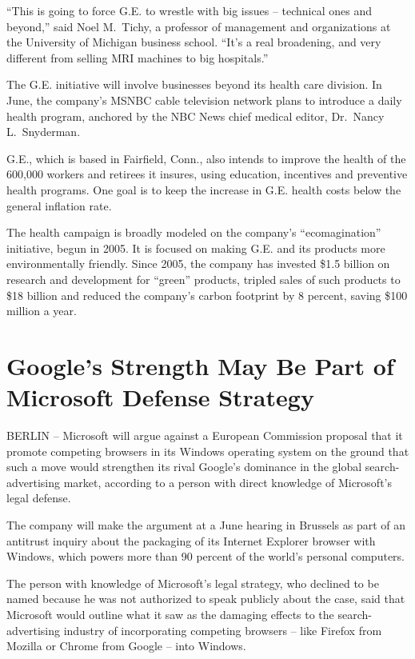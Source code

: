 \documentclass[12pt,a4paper,onecolumn]{article}
\begin{document}
``This is going to force G.E. to wrestle with big issues -- technical ones and beyond,'' said Noel
M.~Tichy, a professor of management and organizations at the University of Michigan business school.
``It's a real broadening, and very different from selling MRI machines to big hospitals.''

The G.E. initiative will involve businesses beyond its health care division. In June, the company's
MSNBC cable television network plans to introduce a daily health program, anchored by the NBC News
chief medical editor, Dr.~Nancy L.~Snyderman.

G.E., which is based in Fairfield, Conn., also intends to improve the health of the 600,000 workers
and retirees it insures, using education, incentives and preventive health programs. One goal is to
keep the increase in G.E. health costs below the general inflation rate.

The health campaign is broadly modeled on the company's ``ecomagination'' initiative, begun in 2005.
It is focused on making G.E. and its products more environmentally friendly. Since 2005, the company
has invested \$1.5 billion on research and development for ``green'' products, tripled sales of such
products to \$18 billion and reduced the company's carbon footprint by 8 percent, saving \$100
million a year.

\section{Google’s Strength May Be Part of Microsoft Defense Strategy}

BERLIN -- Microsoft will argue against a European Commission proposal that it promote competing
browsers in its Windows operating system on the ground that such a move would strengthen its rival
Google's dominance in the global search-advertising market, according to a person with direct
knowledge of Microsoft's legal defense.

The company will make the argument at a June hearing in Brussels as part of an antitrust inquiry
about the packaging of its Internet Explorer browser with Windows, which powers more than 90 percent
of the world's personal computers.

The person with knowledge of Microsoft's legal strategy, who declined to be named because he was not
authorized to speak publicly about the case, said that Microsoft would outline what it saw as the
damaging effects to the search-advertising industry of incorporating competing browsers -- like
Firefox from Mozilla or Chrome from Google -- into Windows.
\end{document}
